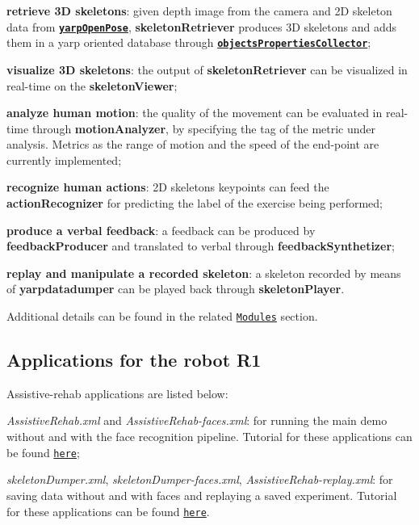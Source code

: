 \begin{DoxyItemize}
\item {\bfseries retrieve 3D skeletons}\+: given depth image from the camera and 2D skeleton data from \href{https://github.com/robotology/human-sensing}{\tt {\bfseries {\ttfamily yarp\+Open\+Pose}}}, {\bfseries {\ttfamily skeleton\+Retriever}} produces 3D skeletons and adds them in a yarp oriented database through \href{http://www.icub.org/doc/icub-main/group__objectsPropertiesCollector.html}{\tt {\bfseries {\ttfamily objects\+Properties\+Collector}}};
\item {\bfseries visualize 3D skeletons}\+: the output of {\bfseries {\ttfamily skeleton\+Retriever}} can be visualized in real-\/time on the {\bfseries {\ttfamily skeleton\+Viewer}};
\item {\bfseries analyze human motion}\+: the quality of the movement can be evaluated in real-\/time through {\bfseries {\ttfamily motion\+Analyzer}}, by specifying the tag of the metric under analysis. Metrics as the range of motion and the speed of the end-\/point are currently implemented;
\item {\bfseries recognize human actions}\+: 2D skeleton\textquotesingle{}s keypoints can feed the {\bfseries {\ttfamily action\+Recognizer}} for predicting the label of the exercise being performed;
\item {\bfseries produce a verbal feedback}\+: a feedback can be produced by {\bfseries {\ttfamily feedback\+Producer}} and translated to verbal through {\bfseries {\ttfamily feedback\+Synthetizer}};
\item {\bfseries replay and manipulate a recorded skeleton}\+: a skeleton recorded by means of {\bfseries {\ttfamily yarpdatadumper}} can be played back through {\bfseries {\ttfamily skeleton\+Player}}.
\end{DoxyItemize}

Additional details can be found in the related \href{https://robotology.github.io/assistive-rehab/doc/doxygen/doc/html/modules.html}{\tt Modules} section.

\subsection*{Applications for the robot R1}

Assistive-\/rehab applications are listed below\+:


\begin{DoxyItemize}
\item {\itshape Assistive\+Rehab.\+xml} and {\itshape Assistive\+Rehab-\/faces.\+xml}\+: for running the main demo without and with the face recognition pipeline. Tutorial for these applications can be found \href{https://robotology.github.io/assistive-rehab/doc/mkdocs/site/main_apps/}{\tt here};
\item {\itshape skeleton\+Dumper.\+xml}, {\itshape skeleton\+Dumper-\/faces.\+xml}, {\itshape Assistive\+Rehab-\/replay.\+xml}\+: for saving data without and with faces and replaying a saved experiment. Tutorial for these applications can be found \href{https://robotology.github.io/assistive-rehab/doc/mkdocs/site/replay_an_experiment/}{\tt here}.
\end{DoxyItemize}

